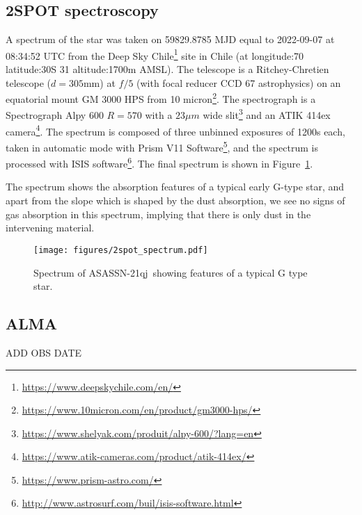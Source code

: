 \documentclass{aa}
\newcommand{\asas}{ASASSN-21qj}
\begin{document}
\subsection{2SPOT spectroscopy}

A spectrum of the star was taken on 59829.8785 MJD equal to 2022-09-07 at 08:34:52 UTC from the Deep Sky Chile\footnote{\url{https://www.deepskychile.com/en/}} site in Chile (at longitude:70
latitude:30\degr S 31 altitude:1700m AMSL).
%
The telescope is a Ritchey-Chretien telescope ($d=305$mm) at $f/5$ (with focal reducer CCD 67 astrophysics) on an equatorial mount GM 3000 HPS from 10 micron\footnote{\url{https://www.10micron.com/en/product/gm3000-hps/}}.
%
The spectrograph is a Spectrograph Alpy 600 $R=570$ with a $23\mu m$ wide slit\footnote{\url{https://www.shelyak.com/produit/alpy-600/?lang=en}} and an ATIK 414ex camera\footnote{\url{https://www.atik-cameras.com/product/atik-414ex/}}.
%
The spectrum is composed of three unbinned exposures of 1200s each, taken in automatic mode with Prism V11 Software\footnote{\url{https://www.prism-astro.com/}}, and the spectrum is processed with ISIS software\footnote{\url{http://www.astrosurf.com/buil/isis-software.html}}.
%
The final spectrum is shown in Figure~\ref{fig:2spotspectrum}.

The spectrum shows the absorption features of a typical early G-type star, and apart from the slope which is shaped by the dust absorption, we see no signs of gas absorption in this spectrum, implying that there is only dust in the intervening material.



\begin{figure}
    \begin{centering}
        \texttt{[image: figures/2spot\_spectrum.pdf]}
\caption{Spectrum of \asas\ showing features of a typical G type star.}
        \label{fig:2spotspectrum}
    \end{centering}
\end{figure}

\subsection{ALMA}

ADD OBS DATE
\end{document}
